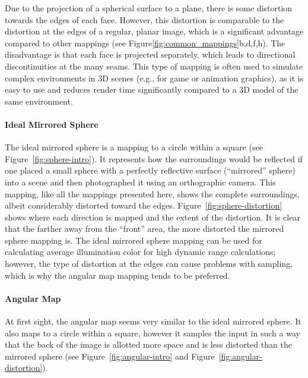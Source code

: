 Due to the projection of a spherical surface to a plane, there is some distortion towards the edges of each face. However, this distortion is comparable to the distortion at the edges of a regular, planar image, which is a significant advantage compared to other mappings (see Figure\ref{fig:common_mappings}b,d,f,h\footnotemark). The disadvantage is that each face is projected separately, which leads to directional discontinuities at the many seams. This type of mapping is often used to simulate complex environments in 3D scenes (e.g., for game or animation graphics), as it is easy to use and reduces render time significantly compared to a 3D model of the same environment.

\cite[p. 540]{hdrbook}

\paragraph{Ideal Mirrored Sphere}
The ideal mirrored sphere is a mapping to a circle within a square (see Figure~\ref{fig:sphere-intro}). It represents how the surroundings would be reflected if one placed a small sphere with a perfectly reflective surface (``mirrored'' sphere) into a scene and then photographed it using an orthographic camera. This mapping, like all the mappings presented here, shows the complete surroundings, albeit considerably distorted toward the edges. Figure~\ref{fig:sphere-distortion} shows where each direction is mapped and the extent of the distortion. It is clear that the farther away from the ``front'' area, the more distorted the mirrored sphere mapping is. The ideal mirrored sphere mapping can be used for calculating average illumination color for high dynamic range calculations; however, the type of distortion at the edges can cause problems with sampling, which is why the angular map mapping tends to be preferred.
\cite[p. 535]{hdrbook}

\paragraph{Angular Map}
At first sight, the angular map seems very similar to the ideal mirrored sphere. It also maps to a circle within a square, however it samples the input in such a way that the back of the image is allotted more space and is less distorted than the mirrored sphere (see Figure~\ref{fig:angular-intro} and Figure~\ref{fig:angular-distortion}).
\cite[p. 537]{hdrbook}

